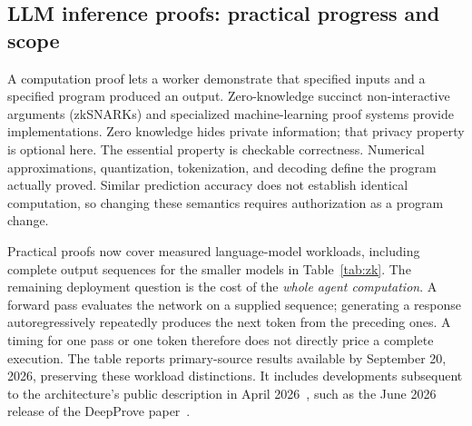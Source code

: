 \documentclass[10pt,letterpaper]{article}
\begin{document}
\subsection{LLM inference proofs: practical progress and scope}
\label{sec:zk}
A computation proof lets a worker demonstrate that specified inputs and a specified program produced an output. Zero-knowledge succinct non-interactive arguments (zkSNARKs) and specialized machine-learning proof systems provide implementations. Zero knowledge hides private information; that privacy property is optional here. The essential property is checkable correctness. Numerical approximations, quantization, tokenization, and decoding define the program actually proved. Similar prediction accuracy does not establish identical computation, so changing these semantics requires authorization as a program change.

Practical proofs now cover measured language-model workloads, including complete output sequences for the smaller models in Table~\ref{tab:zk}. The remaining deployment question is the cost of the \emph{whole agent computation}. A forward pass evaluates the network on a supplied sequence; generating a response autoregressively repeatedly produces the next token from the preceding ones. A timing for one pass or one token therefore does not directly price a complete execution. The table reports primary-source results available by September 20, 2026, preserving these workload distinctions. It includes developments subsequent to the architecture's public description in April 2026~\citep{russell2026}, such as the June 2026 release of the DeepProve paper~\citep{deepprove2026}.
\end{document}
